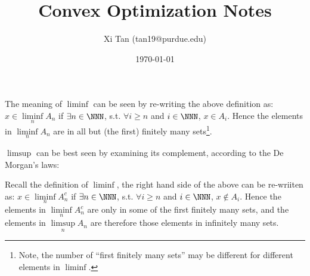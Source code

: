\documentclass{article}
\title{Convex Optimization Notes}
\author{Xi Tan (tan19@purdue.edu)}
\date{\today}
\begin{document}
\maketitle


The meaning of $\liminf$ can be seen by re-writing the above definition as: $x \in \liminf\limits_n A_n$ if $\exists n \in \NNN$, s.t. $\forall i \ge n$ and $i \in \NNN$, $x \in A_i$. Hence the elements in $\liminf\limits_n A_n$ are in all but (the first) finitely many sets\footnote{Note, the number of ``first finitely many sets'' may be different for different elements in $\liminf$.}.


$\limsup$ can be best seen by examining its complement, according to the De Morgan's laws:


Recall the definition of $\liminf$, the right hand side of the above can be re-wriiten as: $x \in \liminf\limits_n A_n^c$ if $\exists n \in \NNN$, s.t. $\forall i \ge n$ and $i \in \NNN$, $x \notin A_i$. Hence the elements in $\liminf\limits_n A_n^c$ are only in some of the first finitely many sets, and the elements in $\limsup\limits_n A_n$ are therefore those elements in infinitely many sets.
\end{document}
